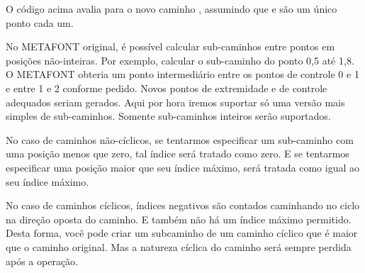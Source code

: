 {{{{{{O código acima avalia para o novo caminho ,
assumindo que  e  são um único ponto
cada um.

No METAFONT original, é possível calcular sub-caminhos entre pontos em
posições não-inteiras. Por exemplo, calcular o sub-caminho do ponto 0,5
até 1,8. O METAFONT obteria um ponto intermediário entre os pontos de
controle 0 e 1 e entre 1 e 2 conforme pedido. Novos pontos de
extremidade e de controle adequados seriam gerados.  Aqui por hora
iremos suportar só uma versão mais simples de sub-caminhos. Somente
sub-caminhos inteiros serão suportados.

No caso de caminhos não-cíclicos, se tentarmos especificar um
sub-caminho com uma posição menos que zero, tal índice será tratado
como zero. E se tentarmos especificar uma posição maior que seu índice
máximo, será tratada como igual ao seu índice máximo.

No caso de caminhos cíclicos, índices negativos são contados
caminhando no ciclo na direção oposta do caminho. E também não há um
índice máximo permitido. Desta forma, você pode criar um subcaminho de
um caminho cíclico que é maior que o caminho original. Mas a natureza
cíclica do caminho será sempre perdida após a operação.

}}}}}}
